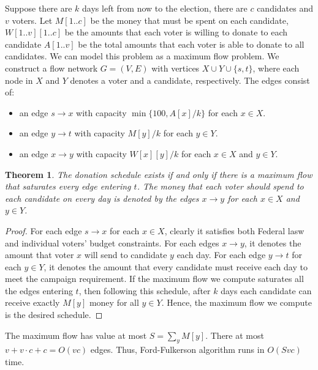\documentclass[letterpaper,11pt]{article}
\newtheorem{theorem}{Theorem}
\begin{document}
\begin{enumerate}
\begin{solution}
  Suppose there are $k$ days left from now to the election, there are $c$
  candidates and $v$ voters.  Let $M[1..c]$ be the money that must be spent on
  each candidate, $W[1..v][1..c]$ be the amounts that each voter is willing to
  donate to each candidate $A[1..v]$ be the total amounts that each voter is
  able to donate to all candidates.
  We can model this problem as a maximum flow problem.
  We construct a flow network $G=(V,E)$ with vertices $X \cup Y \cup \{s,t\}$,
  where each node in $X$ and $Y$ denotes a voter and a candidate, respectively.
  The edges consist of:
  \begin{itemize}
    \item an edge $s \rightarrow x$ with capacity $\min\{100, A[x]/k\}$ for
      each $x\in X$.
    \item an edge $y \rightarrow t$ with capacity $M[y]/k$ for each $y \in Y$.
    \item an edge $x \rightarrow y$ with capacity $W[x][y]/k$ for each $x\in X$
      and $y \in Y$.
  \end{itemize}

  \begin{theorem}
    The donation schedule exists if and only if there is a maximum flow that 
    saturates every edge entering $t$. The money that each voter should spend
    to each candidate on every day is denoted by the edges $x \rightarrow y$
    for each $x\in X$ and $y \in Y$.
  \end{theorem}

  \begin{proof}
    For each edge $s \rightarrow x$ for each $x \in X$, clearly it satisfies
    both Federal lasw and individual voters' budget constraints.
    For each edges $x \rightarrow y$, it denotes the amount that voter $x$ 
    will send to candidate $y$ each day.
    For each edge $y \rightarrow t$ for each $y \in Y$, it denotes the amount 
    that every candidate must receive each day to meet the campaign
    requirement.
    If the maximum flow we compute saturates all the edges entering $t$,
    then following this schedule, after $k$ days each candidate can receive 
    exactly $M[y]$ money for all $y \in Y$.
    Hence, the maximum flow we compute is the desired schedule.
  \end{proof}

  The maximum flow has value at most $S=\sum_y M[y]$. There at most 
  $v + v \cdot c + c = O(vc)$ edges. Thus, Ford-Fulkerson algorithm
  runs in $O(Svc)$ time.
\end{solution}


\end{enumerate}
\end{document}
